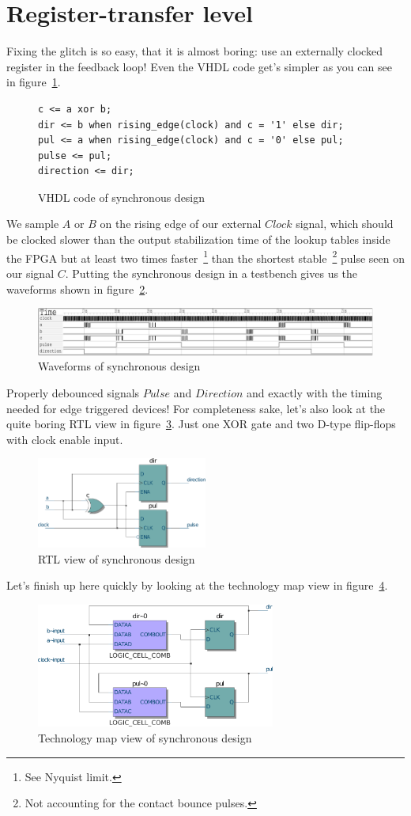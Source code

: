 \documentclass[a4paper]{article}
\begin{document}
\section{Register-transfer level}
Fixing the glitch is so easy, that it is almost boring: use an externally clocked register in the feedback loop!
Even the VHDL code get's simpler as you can see in figure~\ref{fig:syn_vhdl}.
\begin{figure}[h]
\centering
\begin{BVerbatim}
c <= a xor b;
dir <= b when rising_edge(clock) and c = '1' else dir;
pul <= a when rising_edge(clock) and c = '0' else pul;
pulse <= pul;
direction <= dir;
\end{BVerbatim}
\caption{VHDL code of synchronous design}
\label{fig:syn_vhdl}
\end{figure}
We sample $A$ or $B$ on the rising edge of our external $Clock$ signal, which should be clocked slower than the output stabilization time of the lookup tables inside the FPGA but at least two times faster~\footnote{See Nyquist limit.} than the shortest stable~\footnote{Not accounting for the contact bounce pulses.} pulse seen on our signal $C$.
Putting the synchronous design in a testbench gives us the waveforms shown in figure~\ref{fig:syn_wave}.
\begin{figure}[h]
\centering
\includegraphics[width=\textwidth]{quadrature_decoder_gtkwave.pdf}
\caption{Waveforms of synchronous design}
\label{fig:syn_wave}
\end{figure}
Properly debounced signals $Pulse$ and $Direction$ and exactly with the timing needed for edge triggered devices!
For completeness sake, let's also look at the quite boring RTL view in figure~\ref{fig:syn_rtl}.
Just one XOR gate and two D-type flip-flops with clock enable input.
\begin{figure}[h]
\centering
\includegraphics[width=0.5\textwidth]{quadrature_decoder_quartus_rtl.pdf}
\caption{RTL view of synchronous design}
\label{fig:syn_rtl}
\end{figure}
Let's finish up here quickly by looking at the technology map view in figure~\ref{fig:syn_map}.
\begin{figure}[h]
\centering
\includegraphics[width=0.7\textwidth]{quadrature_decoder_quartus_map.pdf}
\caption{Technology map view of synchronous design}
\label{fig:syn_map}
\end{figure}
\end{document}

